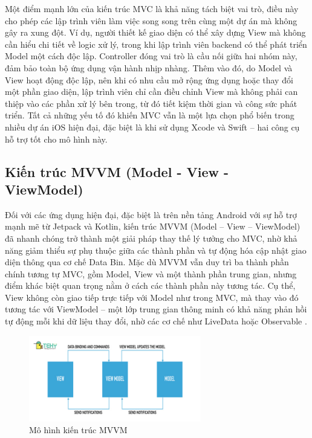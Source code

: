     \begin{flushleft}
      \hspace*{0.8cm}Một điểm mạnh lớn của kiến trúc MVC là khả năng tách biệt vai trò, điều này cho phép các lập trình viên làm việc song song trên cùng một dự án mà không gây ra xung đột. Ví dụ, người thiết kế giao diện có thể xây dựng View mà không cần hiểu chi tiết về logic xử lý, trong khi lập trình viên backend có thể phát triển Model một cách độc lập. Controller đóng vai trò là cầu nối giữa hai nhóm này, đảm bảo toàn bộ ứng dụng vận hành nhịp nhàng. Thêm vào đó, do Model và View hoạt động độc lập, nên khi có nhu cầu mở rộng ứng dụng hoặc thay đổi một phần giao diện, lập trình viên chỉ cần điều chỉnh View mà không phải can thiệp vào các phần xử lý bên trong, từ đó tiết kiệm thời gian và công sức phát triển. Tất cả những yếu tố đó khiến MVC vẫn là một lựa chọn phổ biến trong nhiều dự án iOS hiện đại, đặc biệt là khi sử dụng Xcode và Swift – hai công cụ hỗ trợ tốt cho mô hình này.
    \end{flushleft}

\subsection{Kiến trúc MVVM (Model - View - ViewModel)}
\renewcommand{\labelitemi}{--}    
    \begin{flushleft}
        \hspace*{0.8cm}Đối với các ứng dụng hiện đại, đặc biệt là trên nền tảng Android với sự hỗ trợ mạnh mẽ từ Jetpack và Kotlin, kiến trúc MVVM (Model – View – ViewModel) đã nhanh chóng trở thành một giải pháp thay thế lý tưởng cho MVC, nhờ khả năng giảm thiểu sự phụ thuộc giữa các thành phần và tự động hóa cập nhật giao diện thông qua cơ chế Data Bin. Mặc dù MVVM vẫn duy trì ba thành phần chính tương tự MVC, gồm Model, View và một thành phần trung gian, nhưng điểm khác biệt quan trọng nằm ở cách các thành phần này tương tác. Cụ thể, View không còn giao tiếp trực tiếp với Model như trong MVC, mà thay vào đó tương tác với ViewModel – một lớp trung gian thông minh có khả năng phản hồi tự động mỗi khi dữ liệu thay đổi, nhờ các cơ chế như LiveData hoặc Observable \cite{livedata-observable}.
    \end{flushleft}

\begin{figure}[H]
  \centering
  \includegraphics[width=0.67\textwidth]{images/mvvm.jpg}
  \caption{Mô hình kiến trúc MVVM}
  \label{fig:fig18}
\end{figure}

